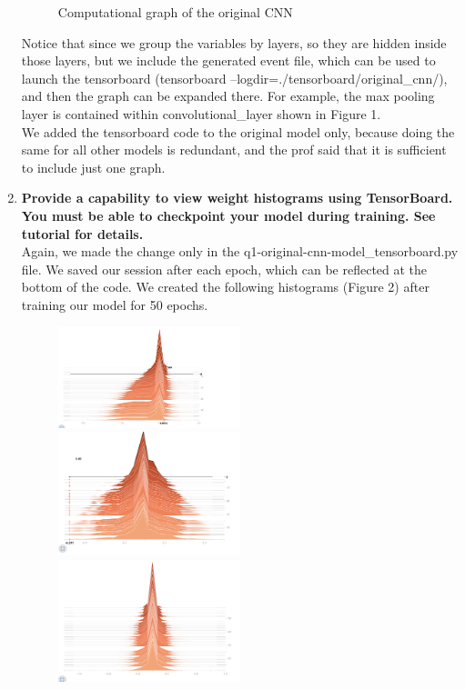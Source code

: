 \documentclass[11pt]{article}
\begin{document}
\begin{enumerate}
\begin{figure}[h!]
        \caption{Computational graph of the original CNN}
\end{figure}
Notice that since we group the variables by layers, so they are hidden inside those layers, but we include the generated event file, which can be used to launch the tensorboard (tensorboard --logdir=./tensorboard/original\_cnn/), and then the graph can be expanded there. For example, the max pooling layer is contained within convolutional\_layer shown in Figure 1.\\
We added the tensorboard code to the original model only, because doing the same for all other models is redundant, and the prof said that it is sufficient to include just one graph.
\item \textbf{Provide a capability to view weight histograms using TensorBoard. You must be able to checkpoint your model during training. See tutorial for details.}\\
Again, we made the change only in the q1-original-cnn-model\_tensorboard.py file. We saved our session after each epoch, which can be reflected at the bottom of the code. We created the following histograms (Figure 2) after training our model for 50 epochs.
\begin{figure}[h!]
    \centering
     \includegraphics[width=0.5\textwidth]{images/histogram_1}
     \includegraphics[width=0.5\textwidth]{images/histogram_2}
    \includegraphics[width=0.5\textwidth]{images/histogram_3}

\end{figure}
\end{enumerate}
\end{document}

